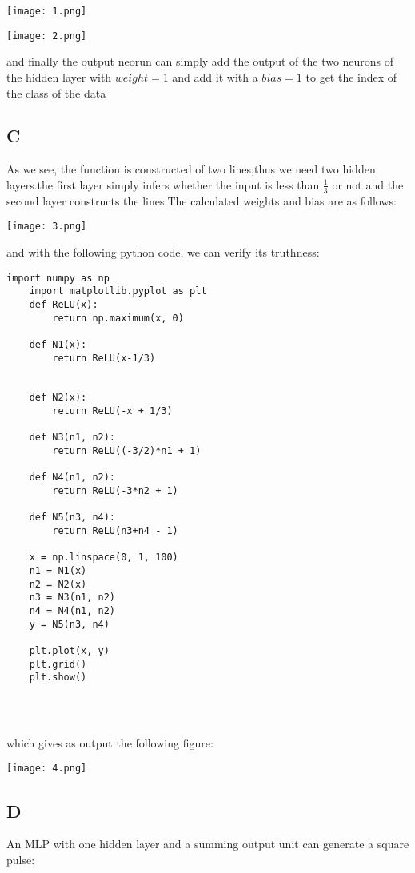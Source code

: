 \documentclass{article}
\begin{document}
\texttt{[image: 1.png]}

\texttt{[image: 2.png]}


and finally the output neorun can simply add the output of the two neurons of the hidden layer with $weight = 1$ and add it with a $bias = 1$ to get the index of the class of the data
    

\subsection*{C}
As we see, the function is constructed of two lines;thus we need two hidden layers.the first layer simply infers whether the input is less than $\frac{1}{3}$ or not and the second layer constructs the lines.The calculated weights and bias are as follows:

\texttt{[image: 3.png]}

and with the following python code, we can verify its truthness:

\begin{lstlisting}[style=mystyle]
    import numpy as np
    import matplotlib.pyplot as plt
    def ReLU(x):
        return np.maximum(x, 0)

    def N1(x):
        return ReLU(x-1/3)


    def N2(x):
        return ReLU(-x + 1/3)

    def N3(n1, n2):
        return ReLU((-3/2)*n1 + 1)

    def N4(n1, n2):
        return ReLU(-3*n2 + 1)

    def N5(n3, n4):
        return ReLU(n3+n4 - 1)

    x = np.linspace(0, 1, 100)
    n1 = N1(x)
    n2 = N2(x)
    n3 = N3(n1, n2)
    n4 = N4(n1, n2)
    y = N5(n3, n4)

    plt.plot(x, y)
    plt.grid()
    plt.show()


    
\end{lstlisting}

which gives as output the following figure:

\texttt{[image: 4.png]}

\subsection*{D}
An MLP with one hidden layer and a summing output unit can generate a square pulse:
\end{document}
